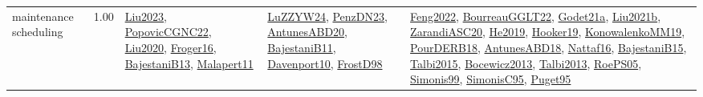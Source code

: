 {\begin{longtable}{p{3cm}r>{\raggedright\arraybackslash}p{6cm}>{\raggedright\arraybackslash}p{6cm}>{\raggedright\arraybackslash}p{8cm}}
\index{maintenance scheduling}\index{ApplicationAreas!maintenance scheduling}maintenance scheduling &  1.00 & \hyperref[detail:Liu2023]{Liu2023}, \hyperref[detail:PopovicCGNC22]{PopovicCGNC22}, \hyperref[detail:Liu2020]{Liu2020}, \hyperref[detail:Froger16]{Froger16}, \hyperref[detail:BajestaniB13]{BajestaniB13}, \hyperref[detail:Malapert11]{Malapert11} & \hyperref[detail:LuZZYW24]{LuZZYW24}, \hyperref[detail:PenzDN23]{PenzDN23}, \hyperref[detail:AntunesABD20]{AntunesABD20}, \hyperref[detail:BajestaniB11]{BajestaniB11}, \hyperref[detail:Davenport10]{Davenport10}, \hyperref[detail:FrostD98]{FrostD98} & \hyperref[detail:Feng2022]{Feng2022}, \hyperref[detail:BourreauGGLT22]{BourreauGGLT22}, \hyperref[detail:Godet21a]{Godet21a}, \hyperref[detail:Liu2021b]{Liu2021b}, \hyperref[detail:ZarandiASC20]{ZarandiASC20}, \hyperref[detail:He2019]{He2019}, \hyperref[detail:Hooker19]{Hooker19}, \hyperref[detail:KonowalenkoMM19]{KonowalenkoMM19}, \hyperref[detail:PourDERB18]{PourDERB18}, \hyperref[detail:AntunesABD18]{AntunesABD18}, \hyperref[detail:Nattaf16]{Nattaf16}, \hyperref[detail:BajestaniB15]{BajestaniB15}, \hyperref[detail:Talbi2015]{Talbi2015}, \hyperref[detail:Bocewicz2013]{Bocewicz2013}, \hyperref[detail:Talbi2013]{Talbi2013}, \hyperref[detail:RoePS05]{RoePS05}, \hyperref[detail:Simonis99]{Simonis99}, \hyperref[detail:SimonisC95]{SimonisC95}, \hyperref[detail:Puget95]{Puget95}\\

\end{longtable}}
